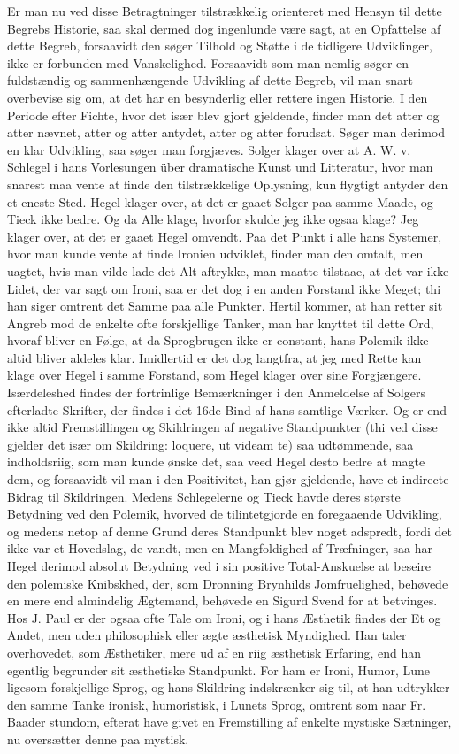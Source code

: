 \documentclass[12pt,a4paper]{article}
\begin{document}
Er man nu ved disse Betragtninger tilstrækkelig orienteret med Hensyn til dette Begrebs Historie, saa skal dermed dog ingenlunde være sagt, at en Opfattelse af dette Begreb, forsaavidt den søger Tilhold og Støtte i de tidligere Udviklinger, ikke er forbunden med Vanskelighed. Forsaavidt som man nemlig søger en fuldstændig og sammenhængende Udvikling af dette Begreb, vil man snart overbevise sig om, at det har en besynderlig eller rettere ingen Historie. I den Periode efter Fichte, hvor det især blev gjort gjeldende, finder man det atter og atter nævnet, atter og atter antydet, atter og atter forudsat. Søger man derimod en klar Udvikling, saa søger man forgjæves. Solger klager over at A. W. v. Schlegel i hans Vorlesungen über dramatische Kunst und Litteratur, hvor man snarest maa vente at finde den tilstrækkelige Oplysning, kun flygtigt antyder den et eneste Sted. Hegel klager over, at det er gaaet Solger paa samme Maade, og Tieck ikke bedre. Og da Alle klage, hvorfor skulde jeg ikke ogsaa klage? Jeg klager over, at det er gaaet Hegel omvendt. Paa det Punkt i alle hans Systemer, hvor man kunde vente at finde Ironien udviklet, finder man den omtalt, men uagtet, hvis man vilde lade det Alt aftrykke, man maatte tilstaae, at det var ikke Lidet, der var sagt om Ironi, saa er det dog i en anden Forstand ikke Meget; thi han siger omtrent det Samme paa alle Punkter. Hertil kommer, at han retter sit Angreb mod de enkelte ofte forskjellige Tanker, man har knyttet til dette Ord, hvoraf bliver en Følge, at da Sprogbrugen ikke er constant, hans Polemik ikke altid bliver aldeles klar. Imidlertid er det dog langtfra, at jeg med Rette kan klage over Hegel i samme Forstand, som Hegel klager over sine Forgjængere. Isærdeleshed findes der fortrinlige Bemærkninger i den Anmeldelse af Solgers efterladte Skrifter, der findes i det 16de Bind af hans samtlige Værker. Og er end ikke altid Fremstillingen og Skildringen af negative Standpunkter (thi ved disse gjelder det især om Skildring: loquere, ut videam te) saa udtømmende, saa indholdsriig, som man kunde ønske det, saa veed Hegel desto bedre at magte dem, og forsaavidt vil man i den Positivitet, han gjør gjeldende, have et indirecte Bidrag til Skildringen. Medens Schlegelerne og Tieck havde deres største Betydning ved den Polemik, hvorved de tilintetgjorde en foregaaende Udvikling, og medens netop af denne Grund deres Standpunkt blev noget adspredt, fordi det ikke var et Hovedslag, de vandt, men en Mangfoldighed af Træfninger, saa har Hegel derimod absolut Betydning ved i sin positive Total-Anskuelse at beseire den polemiske Knibskhed, der, som Dronning Brynhilds Jomfruelighed, behøvede en mere end almindelig Ægtemand, behøvede en Sigurd Svend for at betvinges. Hos J. Paul er der ogsaa ofte Tale om Ironi, og i hans Æsthetik findes der Et og Andet, men uden philosophisk eller ægte æsthetisk Myndighed. Han taler overhovedet, som Æsthetiker, mere ud af en riig æsthetisk Erfaring, end han egentlig begrunder sit æsthetiske Standpunkt. For ham er Ironi, Humor, Lune ligesom forskjellige Sprog, og hans Skildring indskrænker sig til, at han udtrykker den samme Tanke ironisk, humoristisk, i Lunets Sprog, omtrent som naar Fr. Baader stundom, efterat have givet en Fremstilling af enkelte mystiske Sætninger, nu oversætter denne paa mystisk.
\end{document}
